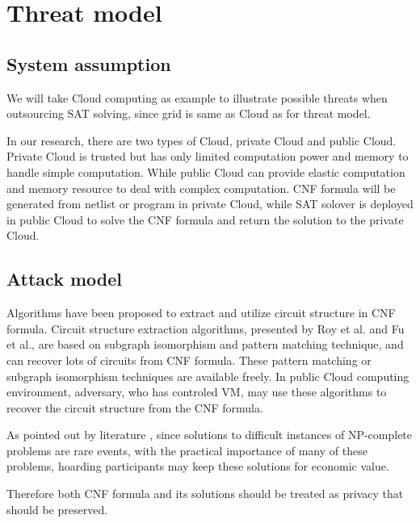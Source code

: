 \documentclass[conference]{IEEEtran}
\begin{document}
\section{Threat model}
\subsection{System assumption}
We will take Cloud computing as example to illustrate possible threats when outsourcing SAT solving,
since grid is same as Cloud as for threat model.

In our research, there are two types of Cloud, private Cloud and public Cloud.
Private Cloud is trusted but has only limited computation power and memory to handle simple computation.
While public Cloud can provide elastic computation and memory resource to deal with complex computation.
CNF formula will be generated from netlist or program in private Cloud,
while SAT solover is deployed in public Cloud to solve the CNF formula and return the solution to the private Cloud.
\subsection{Attack model}

Algorithms \cite{csLiequivalency,csOstrowski,csRoy,csFu}
have been proposed to extract and utilize circuit structure in CNF formula.
Circuit structure extraction algorithms,
presented by Roy et al. \cite{csRoy} and Fu et al.\cite{csFu},
are based on subgraph isomorphism and pattern matching technique,
and can recover lots of circuits from CNF formula.
These pattern matching or subgraph isomorphism techniques are available freely.
In public Cloud computing environment, adversary, who has controled VM\cite{InformationLeakageofCloud,AMI},
may use these algorithms to recover the circuit structure from the CNF formula.

As pointed out by literature \cite{HV-grid}, since solutions to difficult instances of NP-complete problems are rare events,
with the practical importance of many of these problems, hoarding participants may keep these solutions for economic value.

Therefore both CNF formula and its solutions should  be treated as privacy that should be preserved.
\end{document}
